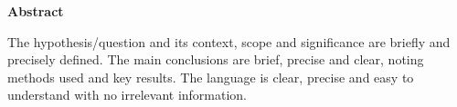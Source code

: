 \small
\noindent\textbf{Abstract}

The hypothesis/question and its context, scope and significance are briefly and precisely defined. The main conclusions are brief, precise and clear, noting methods used and key results. The language is clear, precise and easy to understand with no irrelevant information.